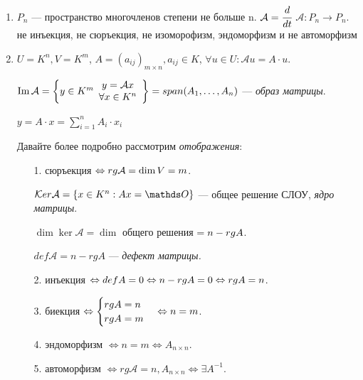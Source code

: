 \begin{enumerate}
    \item $P_n$ --- пространство многочленов степени не больше n. $\mathcal{A}= \cfrac{d}{dt} $ $\mathcal{A}:P_n \rightarrow P_n$. не инъекция, не сюръекция, не изоморофизм, эндоморфизм и не автоморфизм
    \item $U = K^n, V = K^m$, $A = (a_{ij})_{m\times n}, a_{ij} \in K$,  $\forall u \in U   :\mathcal{A}u=A\cdot u$.

    $\operatorname{Im} \mathcal{A} = \left\{y\in K^m \begin{array}{cc}
         y = \mathcal{A}x \\
          \forall x \in K^n
    \end{array}\right\} = span (A_1,\ldots,A_n)$ --- \emph{образ матрицы}.

    $y = A\cdot x = \sum\limits_{i=1}^nA_i\cdot x_i$

    Давайте более подробно рассмотрим \emph{отображения}:

    \begin{itemize}
        \item[1.] сюръекция $\Leftrightarrow rg \mathcal{A} = \dim V  = m$.

        $\ker \mathcal{A} = \{x \in K^n: Ax = \zero\}$ --- общее решение СЛОУ,
        \emph{ядро матрицы}.

        $\dim \ker \mathcal{A} = \dim $ общего решения $= n - rg A$.

            $def \mathcal{A} = n - rg A$ --- \emph{дефект матрицы.}

        \item[2.] инъекция $\Leftrightarrow def A=0 \Leftrightarrow n-rg A = 0 \Leftrightarrow rg A = n$.

        \item[3.] биекция $\Leftrightarrow \begin{cases}
            rg A = n \\
            rg A = m
        \end{cases} \Leftrightarrow n = m$.

        \item[4.] эндоморфизм $\Leftrightarrow n = m \Leftrightarrow A_{n \times n}$.

        \item[5.] автоморфизм $\Leftrightarrow rg \mathcal{A} = n, A_{n\times n }\Leftrightarrow \exists A^{-1}$.
    \end{itemize}


\end{enumerate}


